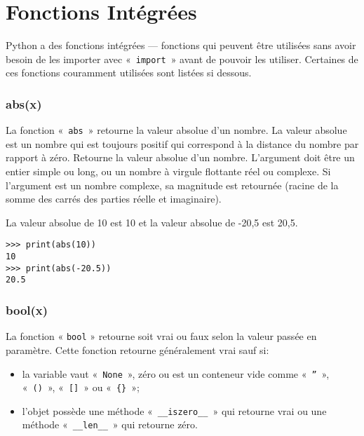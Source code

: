 



\chapter{Fonctions Intégrées}\label{app:fonctionsintégrées}

Python a des fonctions intégrées --- fonctions qui peuvent être utilisées sans avoir besoin de les importer avec «~\texttt{import}~»  avant de pouvoir les utiliser. Certaines de ces fonctions couramment  utilisées sont listées si dessous.

\subsection*{abs(x)}

La fonction «~\texttt{abs}~» retourne la valeur absolue d'un nombre. La valeur absolue est un nombre qui est toujours positif qui correspond à la distance du nombre par rapport à zéro. Retourne la valeur absolue d'un nombre. L'argument doit être un entier simple ou long, ou un nombre à virgule flottante réel ou complexe. Si l'argument est un nombre complexe, sa magnitude est retournée (racine de la somme des carrés des parties réelle et imaginaire).

La valeur absolue de 10 est 10 et la valeur absolue de -20,5 est 20,5. 
\begin{Verbatim}[frame=single,rulecolor=\color{gray}]
>>> print(abs(10))
10
>>> print(abs(-20.5))
20.5
\end{Verbatim}

\subsection*{bool(x)}

La fonction « \texttt{bool} » retourne soit vrai ou faux selon la valeur passée en paramètre. Cette fonction retourne généralement vrai  sauf si:
\begin{itemize}
\item la variable vaut  «~\texttt{None}~», zéro ou est un conteneur vide comme «~\texttt{''}~», «~\texttt{()}~»,  «~\texttt{[]}~» ou «~\texttt{\{\}}~»;
\item l'objet possède une méthode «~\texttt{\_\_iszero\_\_}~» qui retourne vrai ou une méthode «~\texttt{\_\_len\_\_}~» qui retourne zéro.
\end{itemize}

